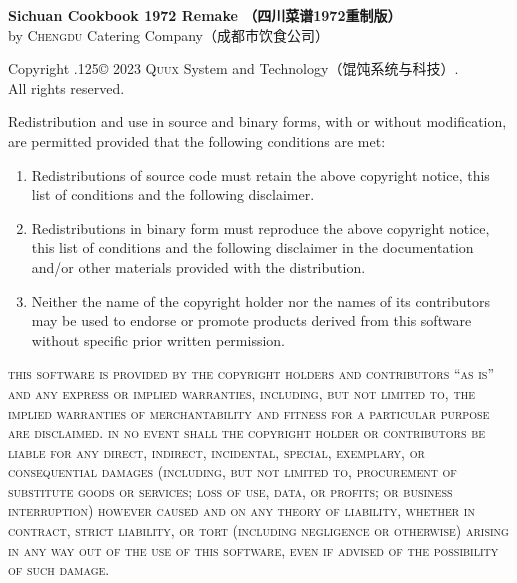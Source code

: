 \begingroup%
\footnotesize%
\singlespacing%
\setlength{\parindent}{0pt}%
\setlength{\parskip}{.1875\baselineskip}%
{\sffamily\bfseries Sichuan Cookbook 1972 Remake\!%
（四川菜谱1972重制版）}\\
by \textsc{Chengdu} Catering Company\!（成都市饮食公司）

\null

Copyright {\lower.125\baselineskip\hbox{\normalsize\copyright}} 2023
\textsc{Quux} System and Technology\!（馄饨系统与科技）\!\!.\\%
All rights reserved.

Redistribution and use in source and binary forms, with or without
modification, are permitted provided that the following conditions are met:

\begin{enumerate}
\item Redistributions of source code must retain the above copyright notice,
      this list of conditions and the following disclaimer.

\item Redistributions in binary form must reproduce the above copyright notice,
      this list of conditions and the following disclaimer in the documentation
      and/or other materials provided with the distribution.

\item Neither the name of the copyright holder nor the names of its
      contributors may be used to endorse or promote products derived from
      this software without specific prior written permission.
\end{enumerate}

\begingroup%
%
\textsc{this software is provided by the copyright holders and contributors
``as is'' and any express or implied warranties, including, but not limited to,
the implied warranties of merchantability and fitness for a particular purpose
are disclaimed. in no event shall the copyright holder or contributors be
liable for any direct, indirect, incidental, special, exemplary, or
consequential damages (including, but not limited to, procurement of
substitute goods or services; loss of use, data, or profits; or business
interruption) however caused and on any theory of liability, whether in
contract, strict liability, or tort (including negligence or otherwise)
arising in any way out of the use of this software, even if advised of the
possibility of such damage.}

\endgroup

